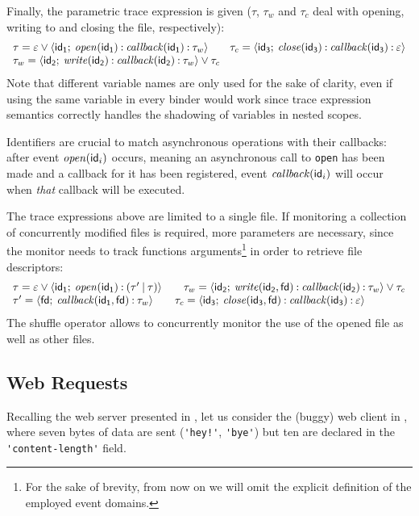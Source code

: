 Finally, the parametric trace expression is given (\(\tau\), \(\tau_w\) and \(\tau_c\) deal with opening, writing to and closing the file, respectively):
$$
\begin{array}{l}
\tau = \varepsilon \mathbin{\vee} {\langle}\mathsf{id_1};\:{\mathit{open}(\mathsf{id_1}) \mathbin{:} \mathit{callback}(\mathsf{id_1}) \mathbin{:} \tau_w}{\rangle}\qquad
\tau_c = {\langle}\mathsf{id_3};\:{\mathit{close}(\mathsf{id_3}) \mathbin{:} \mathit{callback}(\mathsf{id_3}) \mathbin{:} \varepsilon}{\rangle}\\
\tau_w = {\langle}\mathsf{id_2};\:{\mathit{write}(\mathsf{id_2}) \mathbin{:} \mathit{callback}(\mathsf{id_2}) \mathbin{:} \tau_w}{\rangle} \mathbin{\vee} \tau_c
\end{array}
$$
Note that different variable names are only used for the sake of clarity, even if using the same variable in every binder would work since trace expression semantics correctly handles the shadowing of variables in nested scopes.

Identifiers are crucial to match asynchronous operations with their callbacks: after event \(\mathit{open}(\mathsf{id}_i)\) occurs, meaning an asynchronous call to \lstinline|open| has been made and a callback for it has been registered, event \(\mathit{callback}(\mathsf{id}_i)\) will occur when \emph{that} callback will be executed.

The trace expressions above are limited to a single file.
If monitoring a collection of concurrently modified files is required, more parameters are necessary, since the monitor needs to track functions arguments\footnote{For the sake of brevity, from now on we will omit the explicit definition of the employed event domains.} in order to retrieve file descriptors:
$$
\begin{array}{l}
\tau = \varepsilon \mathbin{\vee} {\langle}\mathsf{id_1};\:{\mathit{open}(\mathsf{id_1}) \mathbin{:} (\tau' \mathbin{|} \tau)}{\rangle}\qquad
\tau_w = {\langle}\mathsf{id_2};\:{\mathit{write}(\mathsf{id_2}, \mathsf{fd}) \mathbin{:} \mathit{callback}(\mathsf{id_2}) \mathbin{:} \tau_w}{\rangle} \mathbin{\vee} \tau_c\\
\tau' = {\langle}\mathsf{fd};\:{\mathit{callback}(\mathsf{id_1}, \mathsf{fd}) \mathbin{:} \tau_w}{\rangle}\qquad
\tau_c = {\langle}\mathsf{id_3};\:{\mathit{close}(\mathsf{id_3}, \mathsf{fd}) \mathbin{:} \mathit{callback}(\mathsf{id_3}) \mathbin{:} \varepsilon}{\rangle}
\end{array}
$$
The shuffle operator allows to concurrently monitor the use of the opened file as well as other files.

\subsection{Web Requests}
\label{sec:web-req}
Recalling the web server presented in , let us consider the (buggy) web client in , where seven bytes of data are sent (\lstinline{'hey!'}, \lstinline{'bye'}) but ten are declared in the \lstinline{'content-length'} field.


